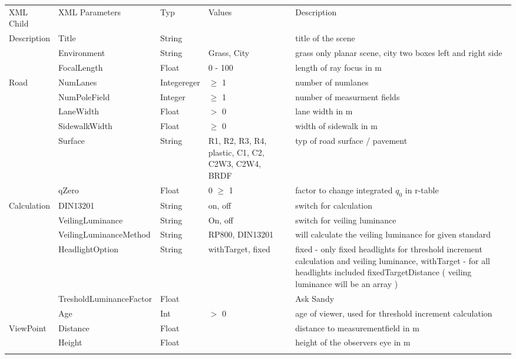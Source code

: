 \documentclass[10pt,a4paper]{report}
\newcommand{\mytoprule}{\specialrule{0.2em}{0em}{0em}}
\newcommand{\mymidrule}{\specialrule{0.1em}{0em}{0em}}
\begin{document}
\begin{landscape}
\pagestyle{empty}
\renewcommand{\arraystretch}{1.5}
	\begin{longtable}{lllp{4cm}p{6cm}}
	\mytoprule
	\rowcolor{dunkelgrau}
		XML  Child & XML Parameters & Typ & Values & Description \\
	\mymidrule
		Description & Title & String & & title of the scene \\
	 	& Environment & String & Grass, City & grass only planar scene, city two boxes left and right side \\
	 	& FocalLength & Float & 0 - 100 & length of ray focus in m \\
	\mymidrule
	\rowcolor{hellgrau}
		Road & NumLanes & Integereger & $\geq$ 1 & number of  numlanes \\\rowcolor{hellgrau}
		 & NumPoleField & Integer & $\geq$ 1 & number of measurment fields \\\rowcolor{hellgrau}
		 & LaneWidth & Float & $>$ 0 & lane width in m \\\rowcolor{hellgrau}
		 & SidewalkWidth & Float & $\geq$ 0 & width of sidewalk in m \\\rowcolor{hellgrau}
		 & Surface & String & R1, R2, R3, R4, plastic, C1, C2, C2W3, C2W4, BRDF & typ of road surface / pavement \\\rowcolor{hellgrau}
	 	 & qZero & Float & 0 $\geq$ 1 & factor to change integrated $q_0$ in r-table \\
	\mymidrule
		Calculation & DIN13201 & String & on, off & switch for calculation  \\
		 & VeilingLuminance & String & On, off & switch for veiling luminance \\
		 & VeilingLuminanceMethod & String & RP800, DIN13201 & will calculate the veiling luminance for given standard \\
		 & HeadlightOption & String & withTarget, fixed & fixed - only fixed headlights for threshold increment calculation and veiling luminance, withTarget - for all headlights included fixedTargetDistance ( veiling luminance will be an array )\\
		 & TresholdLuminanceFactor & Float & & Ask Sandy \\
		 & Age & Int & $>$ 0 & age of viewer, used for threshold increment calculation \\
	\mymidrule
	\rowcolor{hellgrau}
		ViewPoint & Distance & Float & & distance to measurementfield in m \\\rowcolor{hellgrau}
		 & Height & Float & & height of the observers eye in m \\\rowcolor{hellgrau}

\end{longtable}
\end{landscape}
\end{document}
